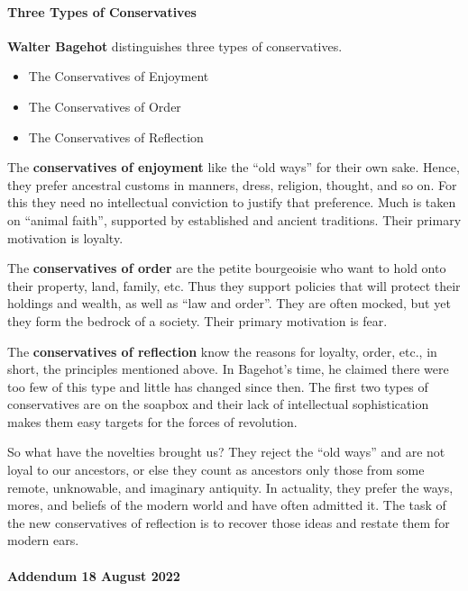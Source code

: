 \paragraph{Three Types of Conservatives}


\textbf{Walter Bagehot} distinguishes three types of conservatives.


\begin{itemize}
\item The Conservatives of Enjoyment
\item The Conservatives of Order
\item The Conservatives of Reflection
\end{itemize}


The \textbf{conservatives of enjoyment} like the ``old ways'' for their own sake. Hence, they prefer ancestral customs in manners, dress, religion, thought, and so on. For this they need no intellectual conviction to justify that preference. Much is taken on ``animal faith'', supported by established and ancient traditions. Their primary motivation is loyalty.

The \textbf{conservatives of order} are the petite bourgeoisie who want to hold onto their property, land, family, etc. Thus they support policies that will protect their holdings and wealth, as well as ``law and order''. They are often mocked, but yet they form the bedrock of a society. Their primary motivation is fear.

The \textbf{conservatives of reflection} know the reasons for loyalty, order, etc., in short, the principles mentioned above. In Bagehot's time, he claimed there were too few of this type and little has changed since then. The first two types of conservatives are on the soapbox and their lack of intellectual sophistication makes them easy targets for the forces of revolution.

So what have the novelties brought us? They reject the ``old ways'' and are not loyal to our ancestors, or else they count as ancestors only those from some remote, unknowable, and imaginary antiquity. In actuality, they prefer the ways, mores, and beliefs of the modern world and have often admitted it. The task of the new conservatives of reflection is to recover those ideas and restate them for modern ears.

\paragraph{Addendum 18 August 2022}



